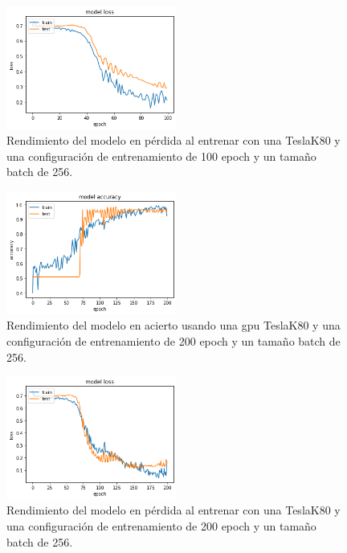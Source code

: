 \begin{figure}
    \centering
    \includegraphics[width=0.5\textwidth]{images/chapter5/batch_256_100_epoch_loss.png}
    \caption{Rendimiento del modelo en pérdida al entrenar con una TeslaK80 y una configuración de entrenamiento de 100 epoch y un tamaño batch de 256.}
    \label{fig:Resultados de loss en el entrenamiento con un batch-size de 256 y 100 epochs}
\end{figure}

\begin{figure}
    \centering
    \includegraphics[width=0.5\textwidth]{images/chapter5/batch_256_200_epoch.png}
    \caption{Rendimiento del modelo en acierto usando una gpu TeslaK80 y una configuración de entrenamiento de 200 epoch y un tamaño batch de 256.}
    \label{fig:Resultados de la precisión de entrenamiento con un batch-size de 256 y 200 epochs}
\end{figure}

\begin{figure}
    \centering
    \includegraphics[width=0.5\textwidth]{images/chapter5/batch_256_200_epoch_loss.png}
    \caption{Rendimiento del modelo en pérdida al entrenar con una TeslaK80 y una configuración de entrenamiento de 200 epoch y un tamaño batch de 256.}
    \label{fig:Resultados de loss en el entrenamiento con un batch-size de 256 y 200 epochs}
\end{figure}


